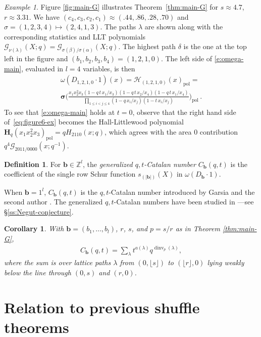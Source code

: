 \documentclass[12pt]{amsart}
\newtheorem{cor}[thm]{Corollary}
\theoremstyle{definition}
\newtheorem{defn}[thm]{Definition}
\theoremstyle{remark}
\newtheorem{example}[thm]{Example}
\newcommand{\ZZ}{{\mathbb Z}}
\newcommand{\bb}{{\mathbf b}}
\newcommand{\Hbold}{{\mathbf H}}
\newcommand{\sigmabold}{{\boldsymbol \sigma }}
\newcommand{\Gcal}{{\mathcal G}}
\newcommand{\Hcat}{{\mathcal H}}  %
\DeclareMathOperator{\dinv}{dinv}
\DeclareMathOperator{\pol}{pol}
\begin{document}
\begin{example}\label{ex:figure6}
Figure \ref{fig:main-G} illustrates Theorem~\ref{thm:main-G}
for $s \approx 4.7$, $r \approx 3.31$.  We have
$(c_4, c_3,c_2,c_1) \approx ( .44,.86, .28,.70)$ and $\sigma =
(1,2,3,4) \mapsto (2,4,1,3)$.  The paths $\lambda$ are shown along
with the corresponding statistics and LLT polynomials
$\Gcal_{\nu(\lambda)}(X;q) =
\Gcal_{\sigma(\beta)/\sigma(\alpha)}(X;q)$.  The highest path $\delta$
is the one at the top left in the figure and $(b_1,b_2,b_3,b_4) = (1,2,1,0)$.  The
left side of \eqref{e:omega-main}, evaluated in $l = 4$ variables, is
then
\begin{multline}\label{eq:figure6-ex}
\omega (D_{1,2,1,0} \cdot 1)(x) = \Hcat _{(1,2,1,0)}(x)_{\pol} =\\
\sigmabold \big(\frac{ x_1x_2^2x_3(1 - q\, t\, x_{1} /x_3)(1 - q\, t\,
x_{2} /x_4)(1 - q\, t\, x_{1} /x_4)} {\prod_{1\le i < j \le 4}(1 - q\,
x_{i}/ x_{j})(1 - t\,x_{i}/ x_{j})} \big)_{\pol}\,.
\end{multline}
To see that
\eqref{e:omega-main} holds at $t = 0$, observe that the right hand side of~\eqref{eq:figure6-ex} becomes the Hall-Littlewood polynomial
$\Hbold_q(x_1x_2^2x_3)_{\pol} = q H_{2110}(x;q)$, which agrees with
the area 0 contribution $q^4 \Gcal_{2011 / 0000}(x;q^{-1})$.
\end{example}


\begin{defn}
\label{def:qt cat number} For $\bb \in \ZZ^l$, the \emph{generalized
$q,t$-Catalan number $C_\bb(q,t)$} is the coefficient of the single
row Schur function $s_{(|\bb|)}(X)$ in $\omega (D_\bb \cdot 1)$.
\end{defn}
When $\mathbf{b}= 1^l$, $C_\bb(q,t)$ is the $q,t$-Catalan number
introduced by Garsia and the second author \cite{GaHa96}.  The
generalized $q,t$-Catalan numbers have been studied in
\cite{GHRS}---see \S \ref{ss:Negut-conjecture}.

\begin{cor}
With $\mathbf{b} = (b_1,\dots, b_l)$, $r$, $s$, and $p = s/r$ as in
Theorem \ref{thm:main-G},
\begin{align}
C_\bb(q,t) = \sum _{\lambda } t^{a(\lambda )}
q^{\dinv _{p}(\lambda )},
\end{align}
where the sum is over lattice paths $\lambda $ from $(0,\lfloor
s\rfloor)$ to $(\lfloor r \rfloor,0)$ lying weakly below the line
through $(0,s)$ and $(r,0)$.
\end{cor}


\section{Relation to previous shuffle theorems}
\setcounter{subsection}{1}
\end{document}
